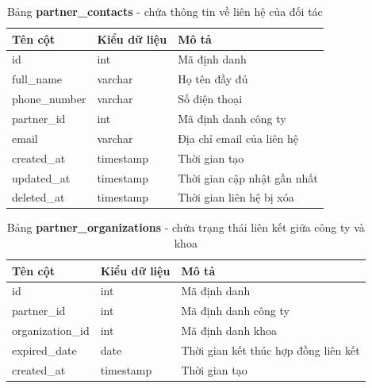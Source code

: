 \documentclass[./../main.tex]{subfiles}
\begin{document}
\begin{table}[H]
	\caption[Bảng partner\_contacts]{Bảng \textbf{partner\_contacts} - chứa thông tin về liên hệ của đối tác}
	\label{tab:db_partner_contacts}
	\begin{tabular}{|l|l|l|}
	\hline
	\textbf{Tên cột} & \textbf{Kiểu dữ liệu} & \textbf{Mô tả}              \\ \hline
	id               & int                   & Mã định danh                \\ \hline
	full\_name       & varchar               & Họ tên đầy đủ               \\ \hline
	phone\_number    & varchar               & Số điện thoại               \\ \hline
	partner\_id      & int                   & Mã định danh công ty        \\ \hline
	email            & varchar               & Địa chỉ email của liên hệ   \\ \hline
	created\_at      & timestamp             & Thời gian tạo               \\ \hline
	updated\_at      & timestamp             & Thời gian cập nhật gần nhất \\ \hline
	deleted\_at      & timestamp             & Thời gian liên hệ bị xóa    \\ \hline
	\end{tabular}
\end{table}

\begin{table}[H]
	\caption[Bảng partner\_organizations]{Bảng \textbf{partner\_organizations} - chứa trạng thái liên kết giữa công ty và khoa}
	\label{tab:db_partner_orgs}
	\begin{tabular}{|l|l|l|}
	\hline
	\textbf{Tên cột} & \textbf{Kiểu dữ liệu} & \textbf{Mô tả}                       \\ \hline
	id               & int                   & Mã định danh                         \\ \hline
	partner\_id      & int                   & Mã định danh công ty                 \\ \hline
	organization\_id & int                   & Mã định danh khoa                    \\ \hline
	expired\_date    & date                  & Thời gian kết thúc hợp đồng liên kết \\ \hline
	created\_at      & timestamp             & Thời gian tạo                        \\ \hline
	\end{tabular}
\end{table}
\end{document}
